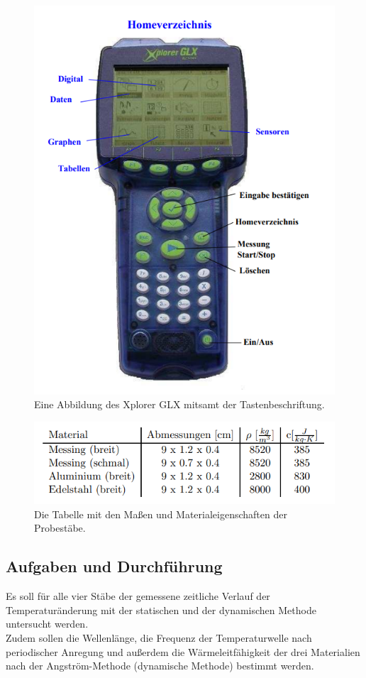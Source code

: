 \begin{figure}[H]
    \centering
    \includegraphics[scale=0.6]{content/GLX.png}
    \caption{Eine Abbildung des Xplorer GLX mitsamt der Tastenbeschriftung. \cite{sample}}
    \label{fig:GLX}
\end{figure}
\begin{figure}[H]
    \centering
    \includegraphics[scale=0.7]{content/StabDaten.png}
    \caption{Die Tabelle mit den Maßen und Materialeigenschaften der Probestäbe. \cite{sample}}
    \label{fig:Masse}
\end{figure}
\subsection{Aufgaben und Durchführung}
\label{subsec:AufgDurch}
Es soll für alle vier Stäbe der gemessene zeitliche Verlauf der Temperaturänderung mit der statischen und
der dynamischen Methode untersucht werden. \\
Zudem sollen die Wellenlänge, die Frequenz der Temperaturwelle
nach periodischer Anregung und außerdem die Wärmeleitfähigkeit der drei Materialien nach
der Angström-Methode (dynamische Methode) bestimmt werden.
